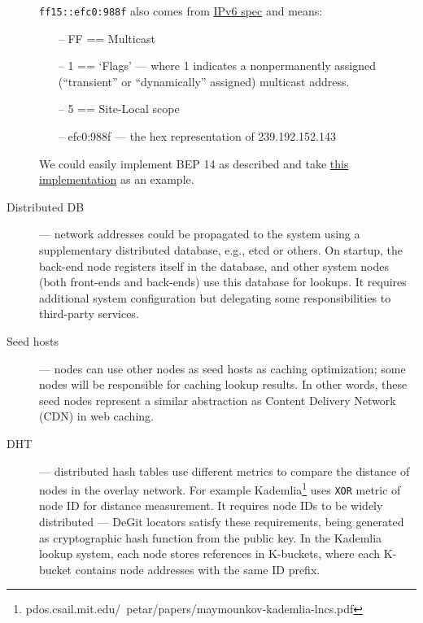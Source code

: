 \documentclass[acmlarge, screen, nonacm, 11pt]{acmart}
\newcommand{\code}[1]{\texttt{#1}}
\begin{document}
\begin{description}
    \code{ff15::efc0:988f} also comes from \href{http://tools.ietf.org/html/rfc4291#section-2.7}{IPv6 spec} and means:
    \begin{itemize}
      \item[--] FF == Multicast
      \item[--] 1 == ‘Flags' --- where 1 indicates a nonpermanently assigned
        (``transient'' or ``dynamically'' assigned) multicast address.
      \item[--] 5 == Site-Local scope
      \item[--] efc0:988f --- the hex representation of 239.192.152.143
    \end{itemize}
    We could easily implement BEP 14 as described and take \href{https://github.com/transmission/transmission/blob/7f147c65fb07a6baed3d079703ff0a31d1b1ca4c/libtransmission/tr-lpd.c}{this implementation} as an example.
  \item[Distributed DB] --- network addresses could be propagated to the system using a supplementary distributed
    database, e.g., etcd or others. On startup, the back-end node registers itself in the database,
    and other system nodes (both front-ends and back-ends) use this database for lookups. 
    It requires additional system configuration but delegating some responsibilities to third-party services.
  \item[Seed hosts] --- nodes can use other nodes as seed hosts as caching optimization; some nodes
    will be responsible for caching lookup results. In other words, these seed nodes represent a similar abstraction
    as Content Delivery Network (CDN) in web caching.
  \item[DHT] --- distributed hash tables use different metrics to compare the distance of nodes in the overlay network.
    For example Kademlia\footnote{pdos.csail.mit.edu/~petar/papers/maymounkov-kademlia-lncs.pdf} uses
    \code{XOR} metric of node ID for distance measurement. It requires node IDs to be widely distributed ---
    DeGit locators satisfy these requirements, being generated as cryptographic hash function from
    the public key. In the Kademlia lookup system, each node stores references in K-buckets, where each K-bucket
    contains node addresses with the same ID prefix.
\end{description}
\end{document}
